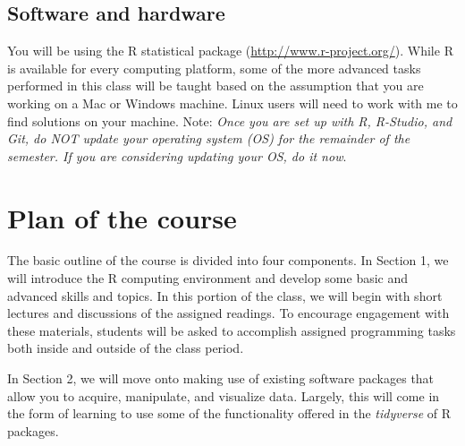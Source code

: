 \documentclass[11pt]{article}
\begin{document}






\subsection*{Software and hardware}

You will be using the R statistical package
(\url{http://www.r-project.org/}). While R is available for every
computing platform, some of the more advanced tasks performed in this
class will be taught based on the assumption that you are working on a
Mac or Windows machine.  Linux users will need to work with me to find
solutions on your machine.  Note: \textit{Once you are set up with R,
  R-Studio, and Git, do NOT update your operating system (OS) for the
  remainder of the semester.  If you are considering updating your OS,
  do it now}.



\section*{Plan of the course}

The basic outline of the course is divided into four components. In
Section 1, we will introduce the R computing environment and develop
some basic and advanced skills and topics.  In this portion of the
class, we will begin with short lectures and discussions of the
assigned readings. To encourage engagement with these materials,
students will be asked to accomplish assigned programming tasks both
inside and outside of the class period. 

In Section 2, we will move onto making use of existing software
packages that allow you to acquire, manipulate, and visualize
data. Largely, this will come in the form of learning to use some of
the functionality offered in the \textit{tidyverse} of R packages.
\end{document}
